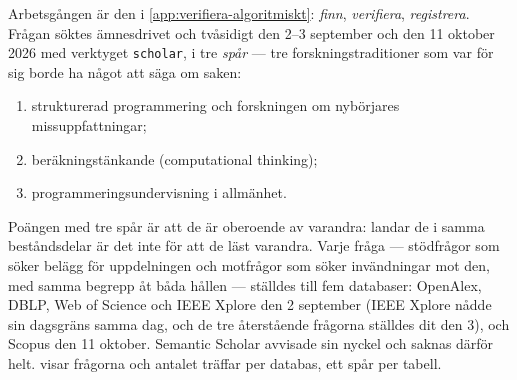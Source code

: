 Arbetsgången är den i
\cref{app:verifiera-algoritmiskt}: \emph{finn}, \emph{verifiera},
\emph{registrera}.  Frågan söktes ämnesdrivet och tvåsidigt den 2--3 september
och den 11 oktober 2026 med verktyget \texttt{scholar}, i tre \emph{spår} --- tre
forskningstraditioner som var för sig borde ha något att säga om saken:
\begin{enumerate}
  \item strukturerad programmering och forskningen om nybörjares
    missuppfattningar;
  \item beräkningstänkande (\foreignlanguage{english}{computational
    thinking});
  \item programmeringsundervisning i allmänhet.
\end{enumerate}
Poängen med tre spår är att de är oberoende av varandra: landar de i samma
beståndsdelar är det inte för att de läst varandra.  Varje fråga ---
stödfrågor som söker belägg för uppdelningen och motfrågor som söker
invändningar mot den, med samma begrepp åt båda hållen --- ställdes till
fem databaser: OpenAlex, DBLP, Web of Science och IEEE Xplore den 2
september (IEEE Xplore nådde sin dagsgräns samma dag, och de tre
återstående frågorna ställdes dit den 3), och Scopus den 11 oktober.
Semantic Scholar avvisade sin nyckel och saknas därför helt.   visar
frågorna och antalet träffar per databas, ett spår per tabell.

